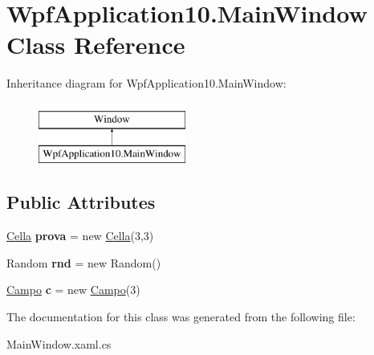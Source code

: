 \hypertarget{class_wpf_application10_1_1_main_window}{}\section{Wpf\+Application10.\+Main\+Window Class Reference}
\label{class_wpf_application10_1_1_main_window}
Inheritance diagram for Wpf\+Application10.\+Main\+Window\+:\begin{figure}[H]
\begin{center}
\leavevmode
\includegraphics[height=2.000000cm]{class_wpf_application10_1_1_main_window}
\end{center}
\end{figure}
\subsection*{Public Attributes}
\begin{DoxyCompactItemize}
\item 
\mbox{\label{class_wpf_application10_1_1_main_window_a9cbba2eb3afe7eb26c5b89dfd9ed8e8b}} 
\hyperlink{class_wpf_application10_1_1_cella}{Cella} {\bfseries prova} = new \hyperlink{class_wpf_application10_1_1_cella}{Cella}(3,3)
\item 
\mbox{\label{class_wpf_application10_1_1_main_window_a974cb0754fff931a7d2ae34f096eceed}} 
Random {\bfseries rnd} = new Random()
\item 
\mbox{\label{class_wpf_application10_1_1_main_window_a1767b2d31ae24ab8c180f833472a7a79}} 
\hyperlink{class_wpf_application10_1_1_campo}{Campo} {\bfseries c} = new \hyperlink{class_wpf_application10_1_1_campo}{Campo}(3)
\end{DoxyCompactItemize}


The documentation for this class was generated from the following file\+:\begin{DoxyCompactItemize}
\item 
Main\+Window.\+xaml.\+cs\end{DoxyCompactItemize}

